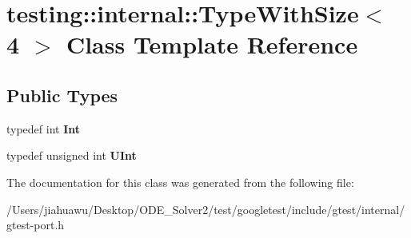 \hypertarget{classtesting_1_1internal_1_1_type_with_size_3_014_01_4}{}\section{testing\+:\+:internal\+:\+:Type\+With\+Size$<$ 4 $>$ Class Template Reference}
\label{classtesting_1_1internal_1_1_type_with_size_3_014_01_4}
\subsection*{Public Types}
\begin{DoxyCompactItemize}
\item 
\mbox{\label{classtesting_1_1internal_1_1_type_with_size_3_014_01_4_a80351860c00ed665e73f952143f4484a}} 
typedef int {\bfseries Int}
\item 
\mbox{\label{classtesting_1_1internal_1_1_type_with_size_3_014_01_4_a7d559570f830bf35d095eeb94d98de58}} 
typedef unsigned int {\bfseries U\+Int}
\end{DoxyCompactItemize}


The documentation for this class was generated from the following file\+:\begin{DoxyCompactItemize}
\item 
/\+Users/jiahuawu/\+Desktop/\+O\+D\+E\+\_\+\+Solver2/test/googletest/include/gtest/internal/gtest-\/port.\+h\end{DoxyCompactItemize}
